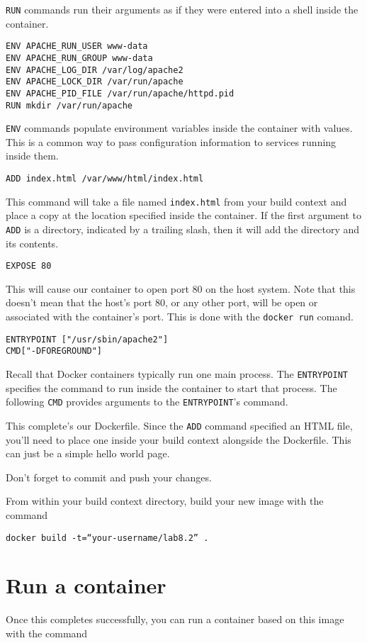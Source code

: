 \documentclass{article}
\begin{document}
\texttt{RUN} commands run their arguments as if they were entered into a shell inside the container.

\begin{verbatim}
ENV APACHE_RUN_USER www-data
ENV APACHE_RUN_GROUP www-data
ENV APACHE_LOG_DIR /var/log/apache2
ENV APACHE_LOCK_DIR /var/run/apache
ENV APACHE_PID_FILE /var/run/apache/httpd.pid
RUN mkdir /var/run/apache
\end{verbatim}

\texttt{ENV} commands populate environment variables inside the container with values. This is a common way to pass configuration information to services running inside them.

\texttt{ADD index.html /var/www/html/index.html }

This command will take a file named \texttt{index.html} from your build context and place a copy at the location specified inside the container. If the first argument to \texttt{ADD} is a directory, indicated by a trailing slash, then it will add the directory and its contents.

\texttt{EXPOSE 80}

This will cause our container to open port 80 on the host system.  Note that this doesn't mean that the host's port 80, or any other port, will be open or associated with the container's port.  This is done with the \texttt{docker run} comand.

\begin{verbatim}
ENTRYPOINT ["/usr/sbin/apache2"]
CMD["-DFOREGROUND"]
\end{verbatim}

Recall that Docker containers typically run one main process.  The \texttt{ENTRYPOINT} specifies the command to run inside the container to start that process. The following \texttt{CMD} provides arguments to the \texttt{ENTRYPOINT}'s command.

This complete's our Dockerfile.  Since the \texttt{ADD} command specified an HTML file, you'll need to place one inside your build context alongside the Dockerfile. This can just be a simple hello world page.

Don't forget to commit and push your changes.


From within your build context directory, build your new image with the command

\texttt{docker build -t=``your-username/lab8.2'' .}


\section{Run a container}
Once this completes successfully, you can run a container based on this image with the command 
\end{document}
